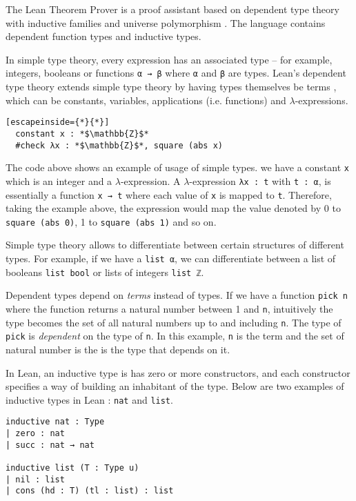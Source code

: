 The Lean Theorem Prover is a proof assistant based on dependent type theory with inductive families and universe polymorphism \cite{inductive_families}. The language contains dependent function types and inductive types.

In simple type theory, every expression has an associated type -- for example, integers, booleans or functions \lstinline{α → β} where \lstinline{α} and \lstinline{β} are types. Lean's dependent type theory extends simple type theory by having types themselves be terms \cite{lean:manual}, which can be constants, variables, applications (i.e. functions) and $\lambda$-expressions.

\begin{lstlisting}[escapeinside={*}{*}]
  constant x : *$\mathbb{Z}$*
  #check λx : *$\mathbb{Z}$*, square (abs x)
\end{lstlisting}

The code above shows an example of usage of simple types. we have a constant \lstinline{x} which is an integer and a $\lambda$-expression. A $\lambda$-expression \lstinline{λx : t} with \lstinline{t : α}, is essentially a function \lstinline{x → t} where each value of \lstinline{x} is mapped to \lstinline{t}. Therefore, taking the example above, the expression would map the value denoted by 0 to \lstinline{square (abs 0)}, 1 to \lstinline{square (abs 1)} and so on.

Simple type theory allows to differentiate between certain structures of different types. For example, if we have a \lstinline{list α}, we can differentiate between a list of booleans \lstinline{list bool} or lists of integers \lstinline{list ℤ}.

Dependent types depend on \textit{terms} instead of types. If we have a function \lstinline{pick n} where the function returns a natural number between 1 and \lstinline{n}, intuitively the type becomes the set of all natural numbers up to and including \lstinline{n}. The type of \lstinline{pick} is \textit{dependent} on the type of \lstinline{n}. In this example, \lstinline{n} is the term and the set of natural number is the is the type that depends on it.

In Lean, an inductive type is has zero or more constructors, and each constructor specifies a way of building an inhabitant of the type. Below are two examples of inductive types in Lean : \lstinline{nat} and \lstinline{list}.

\begin{lstlisting}
inductive nat : Type 
| zero : nat
| succ : nat → nat

inductive list (T : Type u)
| nil : list
| cons (hd : T) (tl : list) : list
\end{lstlisting}

